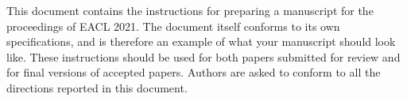 \label{sec:abstract}

This document contains the instructions for preparing a manuscript for the proceedings of EACL 2021.
The document itself conforms to its own specifications, and is therefore an example of what your manuscript should look like.
These instructions should be used for both papers submitted for review and for final versions of accepted papers.
Authors are asked to conform to all the directions reported in this document.